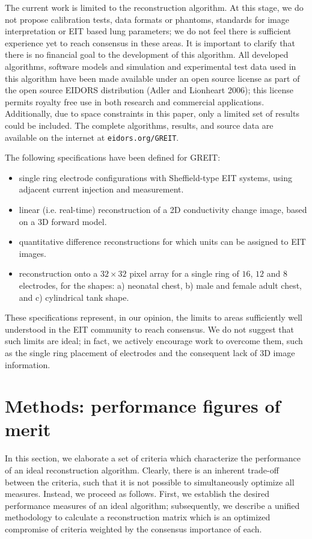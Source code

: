 \documentclass[12pt]{iopart}
\begin{document}
The current work is limited to the reconstruction algorithm.
At this stage, we do not propose calibration tests, data
 formats or phantoms, standards
for image interpretation or EIT based lung parameters; 
we do not feel there is sufficient experience yet to reach
consensus in these areas.
It is important to clarify that there is no financial
goal to the development of this algorithm.
All developed algorithms, software
models and simulation and experimental test data used
in this algorithm have been
made available under an open source license as part of
the open source EIDORS distribution (Adler and Lionheart 2006);
this license permits
royalty free use in both research and commercial applications.
Additionally, due to space constraints in this paper, only a
limited set of results could be included. The complete
algorithms, results, and source data are available on the 
internet at \verb+eidors.org/GREIT+.



The following specifications have been defined for GREIT:
\begin{itemize}
\item
 single ring electrode
configurations with Sheffield-type EIT systems, using
      adjacent current injection and measurement.
\item
 linear (i.e. real-time) reconstruction of a 2D conductivity
change image, based on a 3D forward model.
\item
 quantitative difference reconstructions for which units can
  be assigned to EIT images.
\item
 reconstruction onto 
      a $32\times 32$ pixel array
      for a single ring of $16$, $12$ and $8$ 
      electrodes, for the shapes:
   a) neonatal chest, 
   b) male and female adult chest, and
   c) cylindrical tank shape.
\end{itemize}

These specifications represent, in our opinion, the limits
to areas sufficiently well understood in the EIT community
to reach consensus. We do not suggest that such limits are ideal;
in fact, we actively encourage work to overcome them, 
such as the single ring placement of electrodes and the consequent
lack of 3D image information. 

\section{Methods: performance figures of merit}
\label{sec:figmerit}

In this section, we elaborate a set of criteria which 
characterize the performance of an ideal reconstruction
algorithm. Clearly, there is an inherent trade-off between
the criteria, such that it is not possible to 
simultaneously optimize all measures. Instead, we proceed
as follows. First, we establish the desired performance measures
of an ideal algorithm; subsequently, 
we describe a unified methodology to calculate a reconstruction
matrix which is an optimized compromise of criteria
weighted by the consensus importance of each.  
\end{document}
